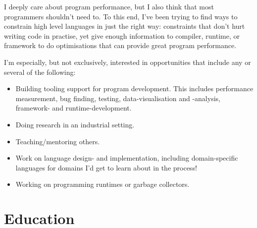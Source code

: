 \documentclass[10pt]{article} %
\begin{document}
I deeply care about program performance, but I also think that most programmers
shouldn't need to. To this end, I've been trying to find ways to constrain high
level languages in just the right way: constraints that don't hurt writing code
in practise, yet give enough information to compiler, runtime, or framework to
do optimisations that can provide great program performance.


I'm especially, but not exclusively, interested in opportunities that include
any or several of the following:

\begin{itemize}
\item Building tooling support for program development. This includes
  performance measurement, bug finding, testing, data-visualisation and
  -analysis, framework- and runtime-development.
\item Doing research in an industrial setting.
\item Teaching/mentoring others.
\item Work on language design- and implementation, including domain-specific languages for domains I'd get to learn about in the process!
\item Working on programming runtimes or garbage collectors.
\end{itemize}


\newcommand{\project}[1]{\emph{#1}}
\newcommand{\ddomains}{\project{Disjointness Domains}}
\newcommand{\spencer}{\project{Spencer}}
\newcommand{\secret}{\project{(name withheld)}}
\newcommand{\encore}{\project{Encore}}

\section{Education}
\end{document}
